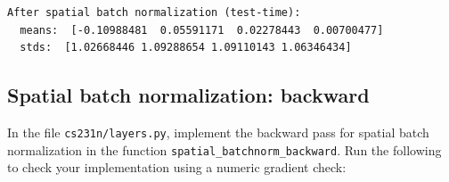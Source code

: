 \documentclass[11pt]{article}
\begin{document}
    \begin{Verbatim}[commandchars=\\\{\}]
After spatial batch normalization (test-time):
  means:  [-0.10988481  0.05591171  0.02278443  0.00700477]
  stds:  [1.02668446 1.09288654 1.09110143 1.06346434]

    \end{Verbatim}

    \subsection{Spatial batch normalization:
backward}\label{spatial-batch-normalization-backward}

In the file \texttt{cs231n/layers.py}, implement the backward pass for
spatial batch normalization in the function
\texttt{spatial\_batchnorm\_backward}. Run the following to check your
implementation using a numeric gradient check:
\end{document}
